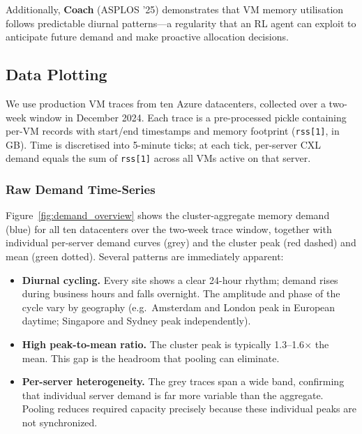 \documentclass[11pt]{article}
\begin{document}
Additionally, \textbf{Coach} (ASPLOS '25) demonstrates that VM memory
utilisation follows predictable diurnal patterns---a regularity that an RL
agent can exploit to anticipate future demand and make proactive allocation
decisions.

\subsection{Data Plotting}
\label{sec:data_plotting}

We use production VM traces from ten Azure datacenters, collected over a
two-week window in December 2024.  Each trace is a pre-processed pickle
containing per-VM records with start/end timestamps and memory footprint
(\texttt{rss[1]}, in GB).  Time is discretised into 5-minute ticks; at each
tick, per-server CXL demand equals the sum of \texttt{rss[1]} across all VMs
active on that server.

\subsubsection*{Raw Demand Time-Series}

Figure~\ref{fig:demand_overview} shows the cluster-aggregate memory demand
(blue) for all ten datacenters over the two-week trace window, together with
individual per-server demand curves (grey) and the cluster peak (red dashed)
and mean (green dotted).  Several patterns are immediately apparent:

\begin{itemize}
    \item \textbf{Diurnal cycling.}  Every site shows a clear 24-hour rhythm;
          demand rises during business hours and falls overnight.  The
          amplitude and phase of the cycle vary by geography (e.g.\ Amsterdam
          and London peak in European daytime; Singapore and Sydney peak
          independently).
    \item \textbf{High peak-to-mean ratio.}  The cluster peak is typically
          1.3--1.6$\times$ the mean.  This gap is the headroom that pooling
          can eliminate.
    \item \textbf{Per-server heterogeneity.}  The grey traces span a wide
          band, confirming that individual server demand is far more variable
          than the aggregate.  Pooling reduces required capacity precisely
          because these individual peaks are not synchronized.
\end{itemize}
\end{document}
